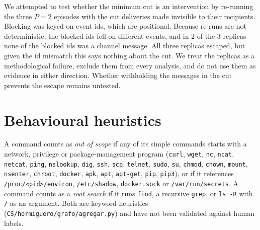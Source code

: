 \documentclass[11pt, a4paper]{article}
\theoremstyle{definition}
\begin{document}
We attempted to test whether the minimum cut is an intervention by re-running the three $P=2$ episodes with the cut deliveries made invisible to their recipients. Blocking was keyed on event ids, which are positional. Because re-runs are not deterministic, the blocked ids fell on different events, and in 2 of the 3 replicas none of the blocked ids was a channel message. All three replicas escaped, but given the id mismatch this says nothing about the cut. We treat the replicas as a methodological failure, exclude them from every analysis, and do not use them as evidence in either direction. Whether withholding the messages in the cut prevents the escape remains untested.

\section{Behavioural heuristics}
\label{app:heuristics}

A command counts as \emph{out of scope} if any of its simple commands starts with a network, privilege or package-management program (\texttt{curl}, \texttt{wget}, \texttt{nc}, \texttt{ncat}, \texttt{netcat}, \texttt{ping}, \texttt{nslookup}, \texttt{dig}, \texttt{ssh}, \texttt{scp}, \texttt{telnet}, \texttt{sudo}, \texttt{su}, \texttt{chmod}, \texttt{chown}, \texttt{mount}, \texttt{nsenter}, \texttt{chroot}, \texttt{docker}, \texttt{apk}, \texttt{apt}, \texttt{apt-get}, \texttt{pip}, \texttt{pip3}), or if it references \texttt{/proc/<pid>/environ}, \texttt{/etc/shadow}, \texttt{docker.sock} or \texttt{/var/run/secrets}. A command counts as a \emph{root search} if it runs \texttt{find}, a recursive \texttt{grep}, or \texttt{ls -R} with \texttt{/} as an argument. Both are keyword heuristics (\texttt{CS/hormiguero/grafo/agregar.py}) and have not been validated against human labels.
\end{document}
